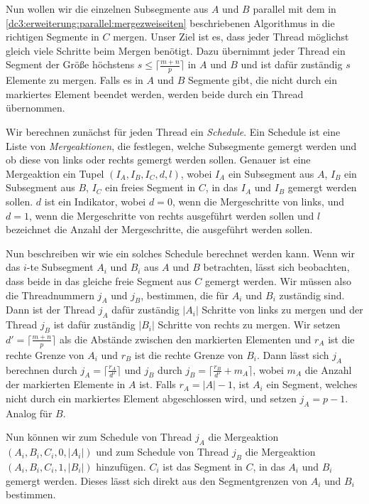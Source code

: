 Nun wollen wir die einzelnen Subsegmente aus $A$ und $B$ parallel mit dem in \cref{dc3:erweiterung:parallel:mergezweiseiten} beschriebenen Algorithmus in die richtigen Segmente in $C$ mergen. Unser Ziel ist es, dass jeder Thread möglichst gleich viele Schritte beim Mergen benötigt. Dazu übernimmt jeder Thread ein Segment der Größe höchstens $s \le \lceil \frac{m+n}{p} \rceil$ in $A$ und $B$ und ist dafür zuständig $s$ Elemente zu mergen. Falls es in $A$ und $B$ Segmente gibt, die nicht durch ein markiertes Element beendet werden, werden beide durch ein Thread übernommen. \par
Wir berechnen zunächst für jeden Thread ein \textit{Schedule}. Ein Schedule ist eine Liste von \textit{Mergeaktionen}, die festlegen, welche Subsegmente gemergt werden und ob diese von links oder rechts gemergt werden sollen. Genauer ist eine Mergeaktion ein Tupel $(I_A, I_B, I_C, d, l)$, wobei $I_A$ ein Subsegment aus $A$, $I_B$ ein Subsegment aus $B$, $I_C$ ein freies Segment in $C$, in das $I_A$ und $I_B$ gemergt werden sollen. $d$ ist ein Indikator, wobei $d = 0$, wenn die Mergeschritte von links, und $d = 1$, wenn die Mergeschritte von rechts ausgeführt werden sollen und $l$ bezeichnet die Anzahl der Mergeschritte, die ausgeführt werden sollen. \par
Nun beschreiben wir wie ein solches Schedule berechnet werden kann. Wenn wir das $i$-te Subsegment $A_i$ und $B_i$ aus $A$ und $B$ betrachten, lässt sich beobachten, dass beide in das gleiche freie Segment aus $C$ gemergt werden. Wir müssen also die Threadnummern $j_A$ und $j_B$, bestimmen, die für $A_i$ und $B_i$ zuständig sind. Dann ist der Thread $j_A$ dafür zuständig $|A_i|$ Schritte von links zu mergen und der Thread $j_B$ ist dafür zuständig $|B_i|$ Schritte von rechts zu mergen. Wir setzen $d' = \lceil \frac{m+n}{p} \rceil$ als die Abstände zwischen den markierten Elementen und $r_A$ ist die rechte Grenze von $A_i$ und $r_B$ ist die rechte Grenze von $B_i$. Dann lässt sich $j_A$ berechnen durch $j_A = \lceil \frac{r_A}{d'} \rceil$ und $j_B$ durch $j_B = \lceil \frac{r_B}{d'}+m_A \rceil$, wobei $m_A$ die Anzahl der markierten Elemente in $A$ ist. Falls $r_A = |A|-1$, ist $A_i$ ein Segment, welches nicht durch ein markiertes Element abgeschlossen wird, und setzen $j_A = p-1$. Analog für $B$. \par
Nun können wir zum Schedule von Thread $j_A$ die Mergeaktion $(A_i, B_i, C_i, 0, |A_i|)$ und zum Schedule von Thread $j_B$ die Mergeaktion $(A_i, B_i, C_i, 1, |B_i|)$ hinzufügen. $C_i$ ist das Segment in $C$, in das $A_i$ und $B_i$ gemergt werden. Dieses lässt sich direkt aus den Segmentgrenzen von $A_i$ und $B_i$ bestimmen. \par
